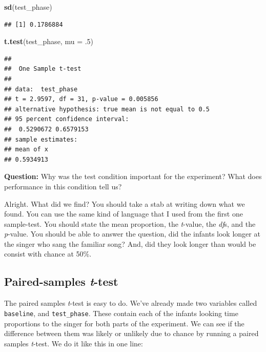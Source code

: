 \documentclass[
]{book}
\newenvironment{Shaded}{\begin{snugshade}}{\end{snugshade}}
\newcommand{\AttributeTok}[1]{\textcolor[rgb]{0.13,0.29,0.53}{#1}}
\newcommand{\DecValTok}[1]{\textcolor[rgb]{0.00,0.00,0.81}{#1}}
\newcommand{\FunctionTok}[1]{\textcolor[rgb]{0.13,0.29,0.53}{\textbf{#1}}}
\newcommand{\NormalTok}[1]{#1}
\begin{document}
\begin{Shaded}
\begin{Highlighting}[]
\FunctionTok{sd}\NormalTok{(test\_phase)}
\end{Highlighting}
\end{Shaded}

\begin{verbatim}
## [1] 0.1786884
\end{verbatim}

\begin{Shaded}
\begin{Highlighting}[]
\FunctionTok{t.test}\NormalTok{(test\_phase, }\AttributeTok{mu =}\NormalTok{ .}\DecValTok{5}\NormalTok{)}
\end{Highlighting}
\end{Shaded}

\begin{verbatim}
## 
##  One Sample t-test
## 
## data:  test_phase
## t = 2.9597, df = 31, p-value = 0.005856
## alternative hypothesis: true mean is not equal to 0.5
## 95 percent confidence interval:
##  0.5290672 0.6579153
## sample estimates:
## mean of x 
## 0.5934913
\end{verbatim}

\textbf{Question:} Why was the test condition important for the experiment? What does performance in this condition tell us?

Alright. What did we find? You should take a stab at writing down what we found. You can use the same kind of language that I used from the first one sample-test. You should state the mean proportion, the \emph{t}-value, the \emph{df}s, and the \emph{p}-value. You should be able to answer the question, did the infants look longer at the singer who sang the familiar song? And, did they look longer than would be consist with chance at 50\%.

\hypertarget{paired-samples-t-test}{%
\subsection{\texorpdfstring{Paired-samples \emph{t}-test}{Paired-samples t-test}}\label{paired-samples-t-test}}

The paired samples \emph{t}-test is easy to do. We've already made two variables called \texttt{baseline}, and \texttt{test\_phase}. These contain each of the infants looking time proportions to the singer for both parts of the experiment. We can see if the difference between them was likely or unlikely due to chance by running a paired samples \emph{t}-test. We do it like this in one line:
\end{document}
